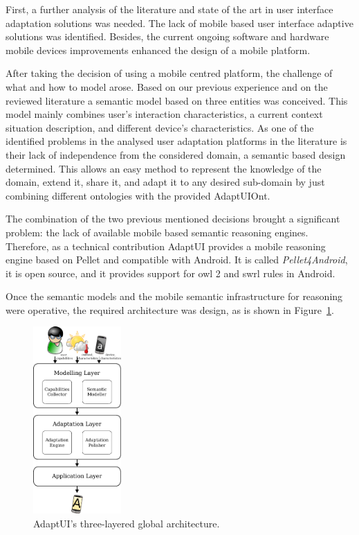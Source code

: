 First, a further analysis of the literature and state of the art in user 
interface adaptation solutions was needed. The lack of mobile based user 
interface adaptive solutions was identified. Besides, the current ongoing 
software and hardware mobile devices improvements enhanced the design of a 
mobile platform.

After taking the decision of using a mobile centred platform, the challenge of
what and how to model arose. Based on our previous experience and on the reviewed
literature a semantic model based on three entities was conceived. This model
mainly combines user's interaction characteristics, a current context situation
description, and different device's characteristics. As one of the identified
problems in the analysed user adaptation platforms in the literature is their
lack of independence from the considered domain, a semantic based design determined.
This allows an easy method to represent the knowledge of the domain, extend it,
share it, and adapt it to any desired sub-domain by just combining different 
ontologies with the provided AdaptUIOnt.

The combination of the two previous mentioned decisions brought a significant
problem: the lack of available mobile based semantic reasoning engines. Therefore,
as a technical contribution AdaptUI provides a mobile reasoning engine based on
Pellet and compatible with Android. It is called \textit{Pellet4Android}, it is
open source, and it provides support for \ac{owl} 2 and \ac{swrl} rules in Android.

Once the semantic models and the mobile semantic infrastructure for reasoning
were operative, the required architecture was design, as is shown in Figure~\ref{fig:architecture_discussion}.

\begin{figure}[H]
\centering
\includegraphics[width=0.30\textwidth]{architecture.pdf}
\caption{AdaptUI's three-layered global architecture.}
\label{fig:architecture_discussion}
\end{figure}

